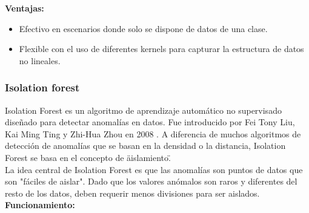 \textbf{Ventajas:}
\begin{itemize}
    \item Efectivo en escenarios donde solo se dispone de datos de una clase.
    \item Flexible con el uso de diferentes kernels para capturar la estructura de datos no lineales.
\end{itemize}


\subsubsection{Isolation forest}

Isolation Forest es un algoritmo de aprendizaje automático no supervisado diseñado para detectar anomalías en datos. Fue introducido por Fei Tony Liu, Kai Ming Ting y Zhi-Hua Zhou en 2008 \cite{liu2008isolation}. A diferencia de muchos algoritmos de detección de anomalías que se basan en la densidad o la distancia, Isolation Forest se basa en el concepto de \"aislamiento\".\\

La idea central de Isolation Forest es que las anomalías son puntos de datos que son "fáciles de aislar". Dado que los valores anómalos son raros y diferentes del resto de los datos, deben requerir menos divisiones para ser aislados. \\

\textbf{Funcionamiento: }

